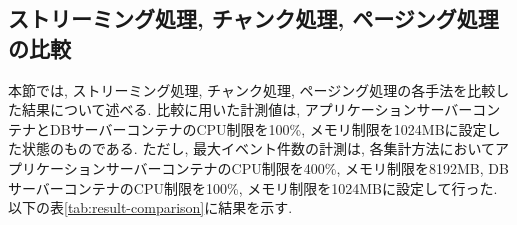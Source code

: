 \documentclass[../../main]{subfiles}
\begin{document}
    

    \subsection{ストリーミング処理, チャンク処理, ページング処理の比較}\label{subsec:result-comparison}

    本節では, ストリーミング処理, チャンク処理, ページング処理の各手法を比較した結果について述べる. 比較に用いた計測値は, アプリケーションサーバーコンテナとDBサーバーコンテナのCPU制限を100\%, メモリ制限を1024MBに設定した状態のものである. ただし, 最大イベント件数の計測は, 各集計方法においてアプリケーションサーバーコンテナのCPU制限を400\%, メモリ制限を8192MB, DBサーバーコンテナのCPU制限を100\%, メモリ制限を1024MBに設定して行った. 以下の表\ref{tab:result-comparison}に結果を示す.

    

    \clearpage
\end{document}
